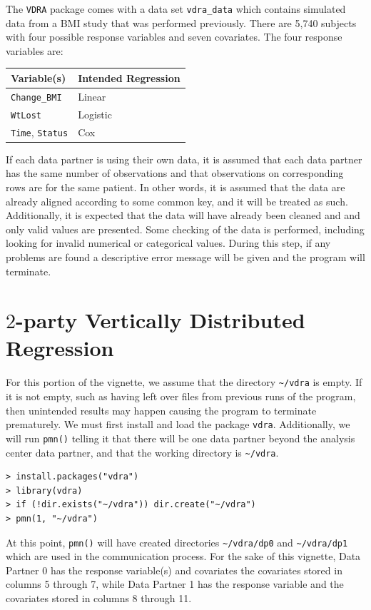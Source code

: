 \documentclass[12]{article}
\begin{document}
The \verb"VDRA" package comes with a data set \verb"vdra_data" which contains simulated data from a BMI study that was performed previously.  There are 5,740 subjects with four possible response variables and seven covariates.  The four response variables are:

\begin{center}
\begin{tabular}{ll}
	Variable(s) & Intended Regression \\ \hline
	\verb"Change_BMI" & Linear\\
	\verb"WtLost" & Logistic \\
	\verb"Time", \verb"Status" & Cox
\end{tabular}
\end{center}


If each data partner is using their own data, it is assumed that each data partner has the same number of observations and that observations on corresponding rows are for the same patient.  In other words, it is assumed that the data are already aligned according to some common key, and it will be treated as such.  Additionally, it is expected that the data will have already been cleaned and and only valid values are presented.  Some checking of the data is performed, including looking for invalid numerical or categorical values. During this step, if any problems are found a descriptive error message will be given and the program will terminate.  

\section{$2$-party Vertically Distributed Regression}

For this portion of the vignette, we assume that the directory \verb"~/vdra" is empty.  If it is not empty, such as having left over files from previous runs of the program, then unintended results may happen causing the program to terminate prematurely.  We must first install and load the package \verb"vdra".  Additionally, we will run \verb"pmn()" telling it that there will be one data partner beyond the analysis center data partner, and that the working directory is \verb"~/vdra".

\begin{verbatim}
> install.packages("vdra")
> library(vdra)
> if (!dir.exists("~/vdra")) dir.create("~/vdra")
> pmn(1, "~/vdra")
\end{verbatim}

At this point, \verb"pmn()" will have created directories \verb"~/vdra/dp0" and \verb"~/vdra/dp1" which are used in the communication process.  For the sake of this vignette, Data Partner 0 has the response variable(s) and covariates the covariates stored in columns 5 through 7, while Data Partner 1 has the response variable and the covariates stored in columns 8 through 11.
\end{document}
